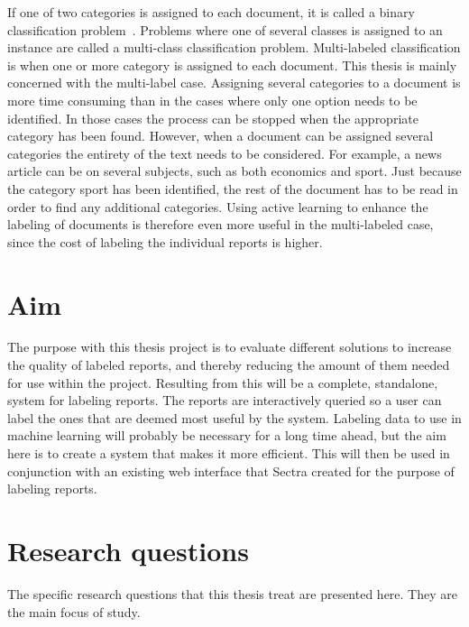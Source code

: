 If one of two categories is assigned to each document, it is called a binary classification problem~\cite{bishop2006pattern}.
Problems where one of several classes is assigned to an instance are called a multi-class classification problem.
Multi-labeled classification is when one or more category is assigned to each document.
This thesis is mainly concerned with the multi-label case.
Assigning several categories to a document is more time consuming than in the cases where only one option needs to be identified.
In those cases the process can be stopped when the appropriate category has been found.
However, when a document can be assigned several categories the entirety of the text needs to be considered.
For example, a news article can be on several subjects, such as both economics and sport.
Just because the category sport has been identified, the rest of the document has to be read in order to find any additional categories.
Using active learning to enhance the labeling of documents is therefore even more useful in the multi-labeled case, since the cost of labeling the individual reports is higher.

\section{Aim}
\label{sec:aim}

The purpose with this thesis project is to evaluate different solutions to increase the quality of labeled reports, and thereby reducing the amount of them needed for use within the project.
Resulting from this will be a complete, standalone, system for labeling reports.
The reports are interactively queried so a user can label the ones that are deemed most useful by the system.
Labeling data to use in machine learning will probably be necessary for a long time ahead, but the aim here is to create a system that makes it more efficient.
This will then be used in conjunction with an existing web interface that Sectra created for the purpose of labeling reports.

\section{Research questions}
\label{sec:research-questions}

The specific research questions that this thesis treat are presented here.
They are the main focus of study.


